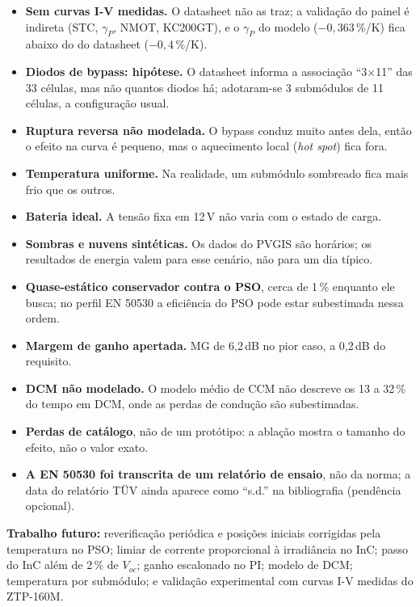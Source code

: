 \begin{itemize}
\item \textbf{Sem curvas I-V medidas.} O datasheet n\~ao as traz; a valida\c{c}\~ao do painel \'e indireta (STC, $\gamma_P$, NMOT, KC200GT), e o $\gamma_P$ do modelo ($-0{,}363$\,\%/K) fica abaixo do do datasheet ($-0{,}4$\,\%/K).
\item \textbf{Diodos de bypass: hip\'otese.} O datasheet informa a associa\c{c}\~ao ``3$\times$11'' das 33 c\'elulas, mas n\~ao quantos diodos h\'a; adotaram-se 3 subm\'odulos de 11 c\'elulas, a configura\c{c}\~ao usual.
\item \textbf{Ruptura reversa n\~ao modelada.} O bypass conduz muito antes dela, ent\~ao o efeito na curva \'e pequeno, mas o aquecimento local (\emph{hot spot}) fica fora.
\item \textbf{Temperatura uniforme.} Na realidade, um subm\'odulo sombreado fica mais frio que os outros.
\item \textbf{Bateria ideal.} A tens\~ao fixa em 12\,V n\~ao varia com o estado de carga.
\item \textbf{Sombras e nuvens sint\'eticas.} Os dados do PVGIS s\~ao hor\'arios; os resultados de energia valem para esse cen\'ario, n\~ao para um dia t\'ipico.
\item \textbf{Quase-est\'atico conservador contra o PSO}, cerca de 1\,\% enquanto ele busca; no perfil EN 50530 a efici\^encia do PSO pode estar subestimada nessa ordem.
\item \textbf{Margem de ganho apertada.} MG de 6,2\,dB no pior caso, a 0,2\,dB do requisito.
\item \textbf{DCM n\~ao modelado.} O modelo m\'edio de CCM n\~ao descreve os 13 a 32\,\% do tempo em DCM, onde as perdas de condu\c{c}\~ao s\~ao subestimadas.
\item \textbf{Perdas de cat\'alogo}, n\~ao de um prot\'otipo: a abla\c{c}\~ao mostra o tamanho do efeito, n\~ao o valor exato.
\item \textbf{A EN 50530 foi transcrita de um relat\'orio de ensaio}, n\~ao da norma; a data do relat\'orio T\"UV ainda aparece como ``s.d.'' na bibliografia (pend\^encia opcional).
\end{itemize}

\textbf{Trabalho futuro:} reverifica\c{c}\~ao peri\'odica e posi\c{c}\~oes iniciais corrigidas pela temperatura no PSO; limiar de corrente proporcional \`a irradi\^ancia no InC; passo do InC al\'em de 2\,\% de $V_{oc}$; ganho
escalonado no PI; modelo de DCM; temperatura por subm\'odulo; e valida\c{c}\~ao experimental com curvas I-V medidas do ZTP-160M.

